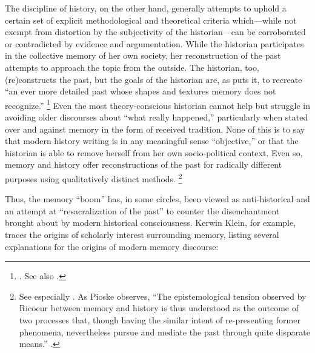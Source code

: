 The discipline of history, on the other hand, generally attempts to uphold a certain set of explicit methodological and theoretical criteria which---while not exempt from distortion by the subjectivity of the historian---can be corroborated or contradicted by evidence and argumentation.%
    \autocite[12--13]{pioske_bibint2015}
While the historian participates in the collective memory of her own society, her reconstruction of the past attempts to approach the topic from the outside. The historian, too, (re)constructs the past, but the goals of the historian are, as \yerushalmi puts it, to recreate ``an ever more detailed past whose shapes and textures memory does not recognize.''%
    \footnote{%
        \Cite[94]{yerushalmi1989}. See also
        \cite[532]{verovsek_pgi2016}.}
Even the most theory-conscious historian cannot help but struggle in avoiding older discourses about ``what really happened,'' particularly when stated over and against memory in the form of received tradition. None of this is to say that modern history writing is in any meaningful sense ``objective,'' or that the historian is able to remove herself from her own socio-political context. Even so, memory and history offer reconstructions of the past for radically different purposes using qualitatively distinct methods.%
    \footnote{See especially 
        \cite[497]{ricoeur2004}. As Pioske observes, ``The epistemological tension observed by Ricoeur between memory and history is thus understood as the outcome of two processes that, though having the similar intent of re-presenting former phenomena, nevertheless pursue and mediate the past through quite disparate means.''
        \cite[12]{pioske_bibint2015}.}

Thus, the memory ``boom'' has, in some circles, been viewed as anti-historical and an attempt at ``resacralization of the past'' to counter the disenchantment brought about by modern historical consciousness.%
    \autocite[282]{winter2006}
Kerwin Klein, for example, traces the origins of scholarly interest surrounding memory, listing several explanations for the origins of modern memory discourse:  

